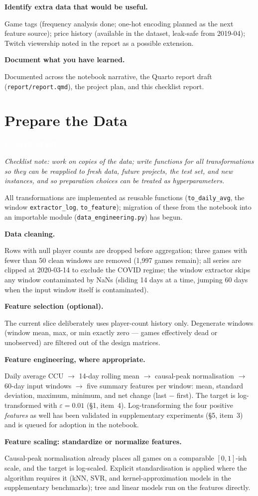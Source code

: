\documentclass[11pt,a4paper]{article}
\newcommand{\StatusBadge}[2]{\colorbox{#1}{\textcolor{white}{\sffamily\bfseries\footnotesize\;#2\;}}}
\newcommand{\SectionStatus}[2]{\noindent\StatusBadge{#1}{#2}\par\medskip}
\newcommand{\chk}[1]{\item \textbf{#1}\par\nopagebreak\vspace{0.15em}}
\newcommand{\guidance}[1]{\textcolor{soft}{\small\itshape Checklist note: #1}\par\medskip}
\begin{document}
\begin{checklist}
\chk{Identify extra data that would be useful.}
Game tags (frequency analysis done; one-hot encoding planned as the next
feature source); price history (available in the dataset, leak-safe from
2019-04); Twitch viewership noted in the report as a possible extension.

\chk{Document what you have learned.}
Documented across the notebook narrative, the Quarto report draft
(\texttt{report/report.qmd}), the project plan, and this checklist report.

\end{checklist}

\section{Prepare the Data}
\SectionStatus{stdone}{COMPLETED}
\guidance{work on copies of the data; write functions for all
transformations so they can be reapplied to fresh data, future projects,
the test set, and new instances, and so preparation choices can be treated
as hyperparameters.}

All transformations are implemented as reusable functions
(\texttt{to\_daily\_avg}, the window \texttt{extractor\_log},
\texttt{to\_feature}); migration of these from the notebook into an
importable module (\texttt{data\_engineering.py}) has begun.

\begin{checklist}

\chk{Data cleaning.}
Rows with null player counts are dropped before aggregation; three games
with fewer than 50 clean windows are removed (1{,}997 games remain); all
series are clipped at 2020-03-14 to exclude the COVID regime; the window
extractor skips any window contaminated by NaNs (sliding 14 days at a time,
jumping 60 days when the input window itself is contaminated).

\chk{Feature selection (optional).}
The current slice deliberately uses player-count history only. Degenerate
windows (window mean, max, or min exactly zero --- games effectively dead or
unobserved) are filtered out of the design matrices.

\chk{Feature engineering, where appropriate.}
Daily average CCU $\rightarrow$ 14-day rolling mean $\rightarrow$
causal-peak normalisation $\rightarrow$ 60-day input windows
$\rightarrow$ five summary features per window: mean, standard deviation,
maximum, minimum, and net change (last $-$ first). The target is
log-transformed with $\varepsilon = 0.01$ (\S1, item~4). Log-transforming
the four positive \emph{features} as well has been validated in
supplementary experiments (\S5, item~3) and is queued for adoption in the
notebook.

\chk{Feature scaling: standardize or normalize features.}
Causal-peak normalisation already places all games on a comparable
$[0,1]$-ish scale, and the target is log-scaled. Explicit standardisation is
applied where the algorithm requires it (kNN, SVR, and kernel-approximation
models in the supplementary benchmarks); tree and linear models run on the
features directly.

\end{checklist}
\end{document}
